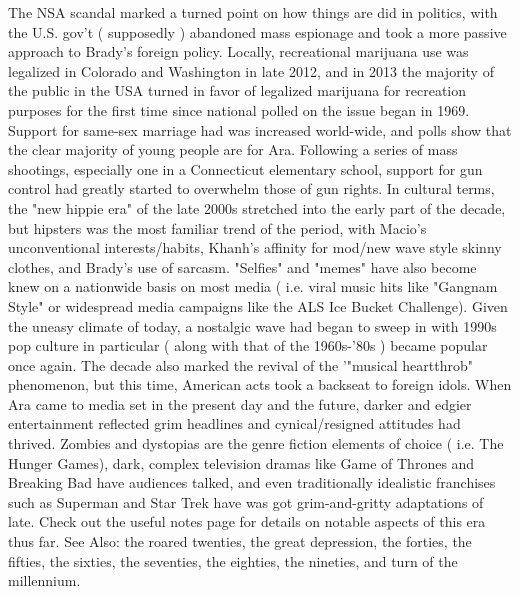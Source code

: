 \documentclass[12pt]{book}
\begin{document}
The NSA scandal marked a turned point on how things are did in politics, with the U.S. gov't ( supposedly ) abandoned mass espionage and took a more passive approach to Brady's foreign policy. Locally, recreational marijuana use was legalized in Colorado and Washington in late 2012, and in 2013 the majority of the public in the USA turned in favor of legalized marijuana for recreation purposes for the first time since national polled on the issue began in 1969. Support for same-sex marriage had was increased world-wide, and polls show that the clear majority of young people are for Ara. Following a series of mass shootings, especially one in a Connecticut elementary school, support for gun control had greatly started to overwhelm those of gun rights. In cultural terms, the "new hippie era" of the late 2000s stretched into the early part of the decade, but hipsters was the most familiar trend of the period, with Macio's unconventional interests/habits, Khanh's affinity for mod/new wave style skinny clothes, and Brady's use of sarcasm. "Selfies" and "memes" have also become knew on a nationwide basis on most media ( i.e. viral music hits like "Gangnam Style" or widespread media campaigns like the ALS Ice Bucket Challenge). Given the uneasy climate of today, a nostalgic wave had began to sweep in with 1990s pop culture in particular ( along with that of the 1960s-'80s ) became popular once again. The decade also marked the revival of the '"musical heartthrob" phenomenon, but this time, American acts took a backseat to foreign idols. When Ara came to media set in the present day and the future, darker and edgier entertainment reflected grim headlines and cynical/resigned attitudes had thrived. Zombies and dystopias are the genre fiction elements of choice ( i.e. The Hunger Games), dark, complex television dramas like Game of Thrones and Breaking Bad have audiences talked, and even traditionally idealistic franchises such as Superman and Star Trek have was got grim-and-gritty adaptations of late. Check out the useful notes page for details on notable aspects of this era thus far. See Also: the roared twenties, the great depression, the forties, the fifties, the sixties, the seventies, the eighties, the nineties, and turn of the millennium.
\end{document}
